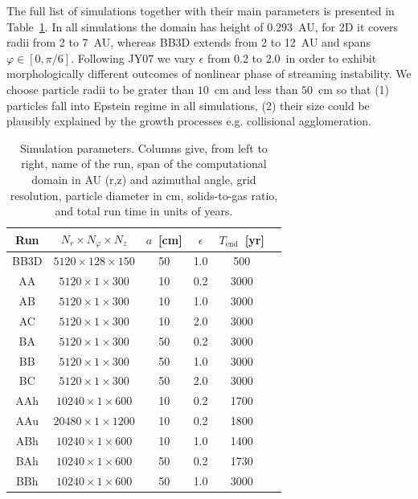 The full list of simulations together with their main parameters is presented in
Table~\ref{tab1}. In all simulations the domain has height of $0.293$~AU,
for 2D it covers radii from 2 to 7~AU, whereas BB3D extends from 2 to 12~AU and
spans $\varphi\in[0, \pi/6]$.  Following JY07 we vary $\epsilon$ from 0.2 to
2.0~in order to exhibit morphologically different outcomes of nonlinear phase of
streaming instability.  We choose particle radii to be grater than $10$~cm and
less than $50$~cm so that (1) particles fall into Epstein regime in all
simulations, (2) their size could be plausibly explained by the growth processes
e.g. collisional agglomeration.

\begin{table}
   \centering
   \begin{tabular}{cccccc}
      \hline
      Run & $N_r \times N_\varphi \times N_z$ &
      $a$~[cm] & $\epsilon$ & $T_\textrm{end}$~[yr] \\
      \hline
      BB3D &  $5120  \times 128 \times 150$  & 50  & 1.0 & 500  \\
      AA   &  $5120  \times 1   \times 300$  & 10  & 0.2 & 3000 \\
      AB   &  $5120  \times 1   \times 300$  & 10  & 1.0 & 3000 \\
      AC   &  $5120  \times 1   \times 300$  & 10  & 2.0 & 3000 \\
      BA   &  $5120  \times 1   \times 300$  & 50  & 0.2 & 3000 \\
      BB   &  $5120  \times 1   \times 300$  & 50  & 1.0 & 3000 \\
      BC   &  $5120  \times 1   \times 300$  & 50  & 2.0 & 3000 \\
      AAh  &  $10240 \times 1   \times 600$  & 10  & 0.2 & 1700 \\
      AAu  &  $20480 \times 1   \times 1200$ & 10  & 0.2 & 1800 \\
      ABh  &  $10240 \times 1   \times 600$  & 10  & 1.0 & 1400 \\
      BAh  &  $10240 \times 1   \times 600$  & 50  & 0.2 & 1730 \\
      BBh  &  $10240 \times 1   \times 600$  & 50  & 1.0 & 3000 \\
      \hline
   \end{tabular}
\caption{Simulation parameters. Columns give, from left to right, name of the
   run, span of the computational domain in AU (r,z) and azimuthal angle, grid
   resolution, particle diameter in cm, solids-to-gas ratio, and total run time
   in units of years.} 
\label{tab1} 
\end{table}
